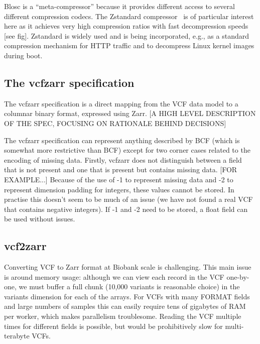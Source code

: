 \documentclass[a4paper,num-refs]{oup-contemporary}
\begin{document}
Blosc is a ``meta-compressor'' because it provides different 
access to several different compression codecs. The 
Zstandard compressor~\citep{collet2021rfc} is of particular 
interest here as it achieves very high compression ratios
with fast decompression speeds [see fig]. 
Zstandard is widely
used and is being incorporated, e.g., as a standard compression
mechanism for HTTP traffic and to decompress Linux kernel images
during boot.

\subsection{The vcfzarr specification}
The vcfzarr specification is a direct mapping from the VCF data model 
to a columnar binary format, expressed using Zarr. [A HIGH LEVEL 
DESCRIPTION OF THE SPEC, FOCUSING ON RATIONALE BEHIND DECISIONS]

The vcfzarr specification can represent anything described by BCF
(which is somewhat more restrictive than BCF) except for two corner
cases related to the encoding of missing data. Firstly, vcfzarr does
not distinguish between a field that is not present and one that 
is present but contains missing data. [FOR EXAMPLE...]
Because of the use of -1 to represent missing data and -2 to 
represent dimension padding for integers, these values 
cannot be stored. In practise this doesn't seem to be much of 
an issue (we have not found a real VCF that contains negative 
integers). If -1 and -2 need to be stored, a float field
can be used without issues.

\subsection{vcf2zarr}
Converting VCF to Zarr format at Biobank scale is challenging. This main issue is 
around memory usage: although we can view each record in the VCF one-by-one,
we must buffer a full chunk (10,000 variants is reasonable choice) 
in the variants dimension for each of the arrays. 
For VCFs with many FORMAT fields and large numbers of samples this can
easily require tens of gigabytes of RAM per worker, which makes 
parallelism troublesome. Reading the VCF multiple times for different fields
is possible, but would be prohibitively slow for multi-terabyte VCFs.
\end{document}
